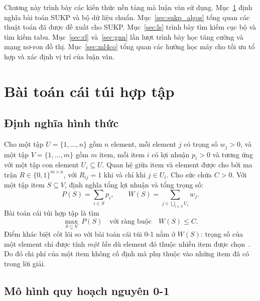 \label{ch:chap2}

Chương này trình bày các kiến thức nền tảng mà luận văn sử dụng. Mục~\ref{sec:sukp_def} định nghĩa bài toán SUKP và bộ dữ liệu chuẩn. Mục~\ref{sec:sukp_algos} tổng quan các thuật toán đã được đề xuất cho SUKP. Mục~\ref{sec:ls} trình bày tìm kiếm cục bộ và tìm kiếm tabu. Mục~\ref{sec:rl} và~\ref{sec:gnn} lần lượt trình bày học tăng cường và mạng nơ-ron đồ thị. Mục~\ref{sec:ml4co} tổng quan các hướng học máy cho tối ưu tổ hợp và xác định vị trí của luận văn.

\section{Bài toán cái túi hợp tập}\label{sec:sukp_def}

\subsection{Định nghĩa hình thức}

Cho một tập $U=\{1,\dots,n\}$ gồm $n$ element, mỗi element $j$ có trọng số $w_j>0$, và một tập $V=\{1,\dots,m\}$ gồm $m$ item, mỗi item $i$ có lợi nhuận $p_i>0$ và tương ứng với một tập con element $U_i\subseteq U$. Quan hệ giữa item và element được cho bởi ma trận $R\in\{0,1\}^{m\times n}$, với $R_{ij}=1$ khi và chỉ khi $j\in U_i$. Cho sức chứa $C>0$. Với một tập item $S\subseteq V$, định nghĩa tổng lợi nhuận và tổng trọng số:
\begin{equation}
P(S)=\sum_{i\in S}p_i,
\qquad
W(S)=\sum_{j\in\bigcup_{i\in S}U_i} w_j .
\label{eq:sukp_pw}
\end{equation}
Bài toán cái túi hợp tập là tìm
\begin{equation}
\max_{S\subseteq V}\ P(S)\quad\text{với ràng buộc}\quad W(S)\le C .
\label{eq:sukp}
\end{equation}
Điểm khác biệt cốt lõi so với bài toán cái túi 0-1 nằm ở $W(S)$: trọng số của một element chỉ được tính \emph{một lần} dù element đó thuộc nhiều item được chọn~\cite{Goldschmidt1994,Wei2021}. Do đó chi phí của một item không cố định mà phụ thuộc vào những item đã có trong lời giải.

\subsection{Mô hình quy hoạch nguyên 0-1}

